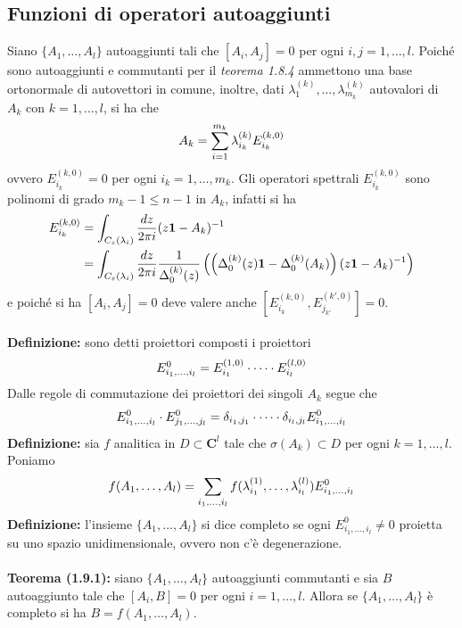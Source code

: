 \documentclass{article}
\begin{document}
\newpage
\subsection{Funzioni di operatori autoaggiunti}
Siano $\{A_1, \dots, A_l\}$ autoaggiunti tali che $[A_i, A_j] = 0$ per ogni $i, j = 1, \dots, l$. Poiché sono autoaggiunti e commutanti per il \textit{teorema 1.8.4} ammettono una base ortonormale di autovettori in comune, inoltre, dati $\lambda^{(k)}_{1}, \dots, \lambda^{(k)}_{m_k}$ autovalori di $A_k$ con $k = 1, \dots, l$, si ha che
\begin{align}
    A_k = \sum_{i = 1}^{m_k} \lambda^{(k)}_{i_k}E^{(k, 0)}_{i_k} \notag
\end{align}
ovvero $E^{(k, 0)}_{i_k} = 0$ per ogni $i_k = 1, \dots, m_k$. Gli operatori spettrali $E^{(k, 0)}_{i_k}$ sono polinomi di grado $m_k - 1 \leq n - 1$ in $A_k$, infatti si ha
\begin{align}
    E^{(k, 0)}_{i_k} &= \int_{C_\varepsilon(\lambda_i)}\frac{dz}{2\pi i}(z\mathbf{1} - A_k)^{-1} \notag \\
    &= \int_{C_\varepsilon(\lambda_i)}\frac{dz}{2\pi i}\frac{1}{\Delta^{(k)}_0(z)}\left(\left(\Delta^{(k)}_0(z)\mathbf{1} - \Delta^{(k)}_0(A_k)\right)(z\mathbf{1} - A_k)^{-1}\right) \notag
\end{align}
e poiché si ha $[A_i, A_j] = 0$ deve valere anche $[E^{(k, 0)}_{i_k}, E^{(k', 0)}_{j_{k'}}] = 0$. \\ \\
\textbf{Definizione:} sono detti proiettori composti i proiettori
\begin{gather}
    E^0_{i_1, \dots, i_l} = E^{(1, 0)}_{i_1} \cdot \dots \cdot E^{(l, 0)}_{i_l} \notag
\end{gather}
Dalle regole di commutazione dei proiettori dei singoli $A_k$ segue che
\begin{gather}
    E^0_{i_1, \dots, i_l} \cdot E^0_{j_1, \dots, j_l} = \delta_{i_1, j_1} \cdot \dots \cdot \delta_{i_l, j_l}E^0_{i_1, \dots, i_l} \notag
\end{gather}
\textbf{Definizione:} sia $f$ analitica in $D \subset \mathbf{C}^l$ tale che $\sigma(A_k) \subset D$ per ogni $k = 1, \dots, l$. Poniamo
\begin{gather}
    f(A_1, \dots, A_l) = \sum_{i_1, \dots, i_l}f(\lambda^{(1)}_{i_1}, \dots, \lambda^{(l)}_{i_l})E^0_{i_1, \dots, i_l} \notag
\end{gather}
\textbf{Definizione:} l'insieme $\{A_1, \dots, A_l\}$ si dice completo se ogni $E^0_{i_1, \dots, i_l} \neq 0$ proietta su uno spazio unidimensionale, ovvero non c'è degenerazione. \\ \\
\textbf{Teorema (1.9.1):} siano $\{A_1, \dots, A_l\}$ autoaggiunti commutanti e sia $B$ autoaggiunto tale che $[A_i, B] = 0$ per ogni $i = 1, \dots, l$. Allora se $\{A_1, \dots, A_l\}$ è completo si ha $B = f(A_1, \dots, A_l)$. \\
\end{document}
